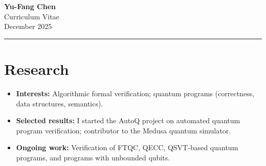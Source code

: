 \documentclass[11pt]{article}
\begin{document}
\begin{minipage}[t]{0.55\textwidth}
  {\Huge\bfseries\textcolor{cvred}{Yu-Fang Chen}}\\[4pt]
  {\Large Curriculum Vitae}\\[12pt]
  December 2025
\end{minipage}
\hfill
\begin{minipage}[t]{0.42\textwidth}
\end{minipage}

\vspace{1em}
\hrule
\vspace{0.8em}

\section*{Research}
\begin{itemize}
  \item \textbf{Interests:} Algorithmic formal verification; quantum programs (correctness, data structures, semantics).
  \item \textbf{Selected results:} I started the AutoQ project on automated quantum program verification; contributor to the Medusa quantum simulator.
  \item \textbf{Ongoing work:} Verification of FTQC, QECC, QSVT-based quantum programs, and programs with unbounded qubits.
\end{itemize}
\end{document}
